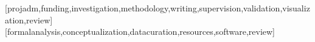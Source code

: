 \documentclass[spanish]{textolivre}
\begin{document}
\begin{contributors}
[projadm,funding,investigation,methodology,writing,supervision,validation,visualization,review]
[formalanalysis,conceptualization,datacuration,resources,software,review]
\end{contributors}
\end{document}
